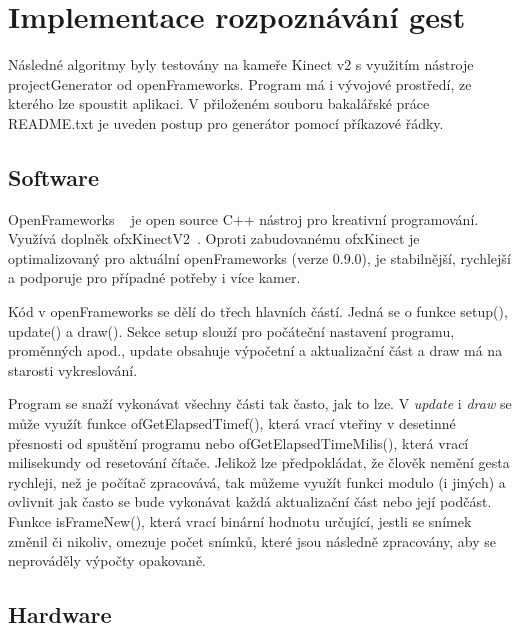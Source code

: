 \chapter{Implementace rozpoznávání gest}
Následné algoritmy byly testovány na kameře Kinect v2 s využitím nástroje  projectGenerator od openFrameworks. Program má i vývojové prostředí, ze kterého lze spoustit aplikaci. V přiloženém souboru bakalářské práce README.txt je uveden postup pro generátor pomocí příkazové řádky.

\section{Software}

OpenFrameworks ~\cite{1} je open source C++ nástroj pro kreativní programování.\\
Využívá doplněk ofxKinectV2~\cite{2}. Oproti zabudovanému ofxKinect je optimalizovaný pro aktuální openFrameworks (verze 0.9.0), je stabilnější, rychlejší a podporuje pro případné potřeby i více kamer.

Kód v openFrameworks se dělí do třech hlavních částí. Jedná se o funkce setup(), update() a draw(). Sekce setup slouží pro počáteční nastavení programu, proměnných apod., update obsahuje výpočetní a aktualizační část a draw má na starosti vykreslování.

Program se snaží vykonávat všechny části tak často, jak to lze. V \textit{update} i \textit{draw} se může využít funkce ofGetElapsedTimef(), která vrací vteřiny v desetinné přesnosti od spuštění programu nebo ofGetElapsedTimeMilis(), která vrací milisekundy od resetování čítače. Jelikož lze předpokládat, že člověk nemění gesta rychleji, než je počítač zpracovává, tak můžeme využít funkci modulo (i jiných) a ovlivnit jak často se bude vykonávat každá aktualizační část nebo její podčást. Funkce isFrameNew(), která vrací binární hodnotu určující, jestli se snímek změnil či nikoliv, omezuje počet snímků, které jsou následně zpracovány, aby se neprováděly výpočty opakovaně.


\section{Hardware}

